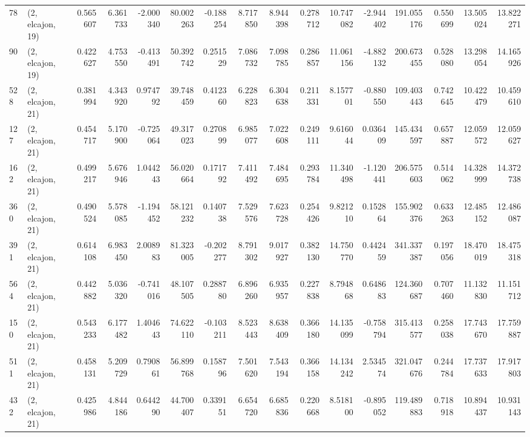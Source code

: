 \begin{tabular}{llrrrrrrrrrrrrrr}
78  &  (2, elcajon, 19) &   0.565607 &   6.361733 &  -2.000340 &    80.002263 &  -0.188254 &   8.717850 &   8.944398 &  0.278712 &  10.747082 &  -2.944402 &   191.055176 &  0.550699 &  13.505024 &  13.822271 \\
90  &  (2, elcajon, 19) &   0.422627 &   4.753550 &  -0.413491 &    50.392742 &   0.251529 &   7.086732 &   7.098785 &  0.286857 &  11.061156 &  -4.882132 &   200.673455 &  0.528080 &  13.298054 &  14.165926 \\
528 &  (2, elcajon, 21) &   0.381994 &   4.343920 &   0.974792 &    39.748459 &   0.412360 &   6.228823 &   6.304638 &  0.211331 &   8.157701 &  -0.880550 &   109.403443 &  0.742645 &  10.422479 &  10.459610 \\
127 &  (2, elcajon, 21) &   0.454717 &   5.170900 &  -0.725064 &    49.317023 &   0.270899 &   6.985077 &   7.022608 &  0.249111 &   9.616044 &   0.036409 &   145.434597 &  0.657887 &  12.059572 &  12.059627 \\
162 &  (2, elcajon, 21) &   0.499217 &   5.676946 &   1.044243 &    56.020664 &   0.171792 &   7.411492 &   7.484695 &  0.293784 &  11.340498 &  -1.120441 &   206.575603 &  0.514062 &  14.328999 &  14.372738 \\
360 &  (2, elcajon, 21) &   0.490524 &   5.578085 &  -1.194452 &    58.121232 &   0.140738 &   7.529576 &   7.623728 &  0.254426 &   9.821210 &   0.152864 &   155.902376 &  0.633263 &  12.485152 &  12.486087 \\
391 &  (2, elcajon, 21) &   0.614108 &   6.983450 &   2.008983 &    81.323005 &  -0.202277 &   8.791302 &   9.017927 &  0.382130 &  14.750770 &   0.442459 &   341.337387 &  0.197056 &  18.470019 &  18.475318 \\
564 &  (2, elcajon, 21) &   0.442882 &   5.036320 &  -0.741016 &    48.107505 &   0.288780 &   6.896260 &   6.935957 &  0.227838 &   8.794868 &   0.648683 &   124.360687 &  0.707460 &  11.132830 &  11.151712 \\
150 &  (2, elcajon, 21) &   0.543233 &   6.177482 &   1.404643 &    74.622110 &  -0.103211 &   8.523443 &   8.638409 &  0.366180 &  14.135099 &  -0.758794 &   315.413577 &  0.258038 &  17.743670 &  17.759887 \\
511 &  (2, elcajon, 21) &   0.458131 &   5.209729 &   0.790861 &    56.899768 &   0.158796 &   7.501620 &   7.543194 &  0.366158 &  14.134242 &   2.534574 &   321.047676 &  0.244784 &  17.737633 &  17.917803 \\
432 &  (2, elcajon, 21) &   0.425986 &   4.844186 &   0.644290 &    44.700407 &   0.339151 &   6.654720 &   6.685836 &  0.220668 &   8.518100 &  -0.895052 &   119.489883 &  0.718918 &  10.894437 &  10.931143 \\

\end{tabular}
